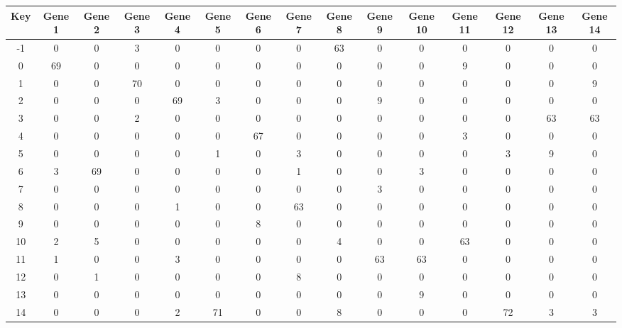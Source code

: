 \begin{tabular}{|c|c|c|c|c|c|c|c|c|c|c|c|c|c|c|}
\hline
Key & Gene 1 & Gene 2 & Gene 3 & Gene 4 & Gene 5 & Gene 6 & Gene 7 & Gene 8 & Gene 9 & Gene 10 & Gene 11 & Gene 12 & Gene 13 & Gene 14 \\
\hline
-1 & 0 & 0 & 3 & 0 & 0 & 0 & 0 & 63 & 0 & 0 & 0 & 0 & 0 & 0 \\
0 & 69 & 0 & 0 & 0 & 0 & 0 & 0 & 0 & 0 & 0 & 9 & 0 & 0 & 0 \\
1 & 0 & 0 & 70 & 0 & 0 & 0 & 0 & 0 & 0 & 0 & 0 & 0 & 0 & 9 \\
2 & 0 & 0 & 0 & 69 & 3 & 0 & 0 & 0 & 9 & 0 & 0 & 0 & 0 & 0 \\
3 & 0 & 0 & 2 & 0 & 0 & 0 & 0 & 0 & 0 & 0 & 0 & 0 & 63 & 63 \\
4 & 0 & 0 & 0 & 0 & 0 & 67 & 0 & 0 & 0 & 0 & 3 & 0 & 0 & 0 \\
5 & 0 & 0 & 0 & 0 & 1 & 0 & 3 & 0 & 0 & 0 & 0 & 3 & 9 & 0 \\
6 & 3 & 69 & 0 & 0 & 0 & 0 & 1 & 0 & 0 & 3 & 0 & 0 & 0 & 0 \\
7 & 0 & 0 & 0 & 0 & 0 & 0 & 0 & 0 & 3 & 0 & 0 & 0 & 0 & 0 \\
8 & 0 & 0 & 0 & 1 & 0 & 0 & 63 & 0 & 0 & 0 & 0 & 0 & 0 & 0 \\
9 & 0 & 0 & 0 & 0 & 0 & 8 & 0 & 0 & 0 & 0 & 0 & 0 & 0 & 0 \\
10 & 2 & 5 & 0 & 0 & 0 & 0 & 0 & 4 & 0 & 0 & 63 & 0 & 0 & 0 \\
11 & 1 & 0 & 0 & 3 & 0 & 0 & 0 & 0 & 63 & 63 & 0 & 0 & 0 & 0 \\
12 & 0 & 1 & 0 & 0 & 0 & 0 & 8 & 0 & 0 & 0 & 0 & 0 & 0 & 0 \\
13 & 0 & 0 & 0 & 0 & 0 & 0 & 0 & 0 & 0 & 9 & 0 & 0 & 0 & 0 \\
14 & 0 & 0 & 0 & 2 & 71 & 0 & 0 & 8 & 0 & 0 & 0 & 72 & 3 & 3 \\
\hline
\end{tabular}